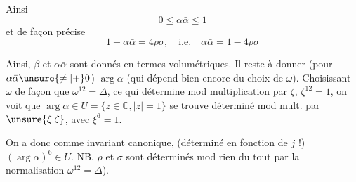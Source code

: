 Ainsi
\[
 0\leq\alpha\bar\alpha\leq1
\]
et de façon précise
\[
 1-\alpha\bar\alpha=4\rho\sigma,\quad\text{i.e.}\quad \alpha\bar\alpha=1-4\rho\sigma
\]

Ainsi, $\beta$ et $\alpha\bar\alpha$ sont donnés en termes volumétriques. Il reste à donner (pour $\alpha\bar\alpha\unsure{\ne|+}0$) $\arg\alpha$ (qui dépend bien  encore du choix de $\omega$). Choisissant $\omega$ de façon que $\omega^{12}=\Delta$, ce qui  détermine mod multiplication par $\zeta$, $\zeta^{12}=1$, on voit que $\arg\alpha\in U=\{z\in\mathbb C,\lvert z\rvert=1\}$ se trouve déterminé mod  mult. par $\unsure{\xi|\zeta}$, avec $\xi^6=1$.

On a donc comme invariant canonique, (déterminé  en fonction de $j$ !) $(\arg\alpha)^6\in U$. NB. $\rho$ et $\sigma$ sont déterminés mod rien du tout par la normalisation $\omega^{12}=\Delta$).
